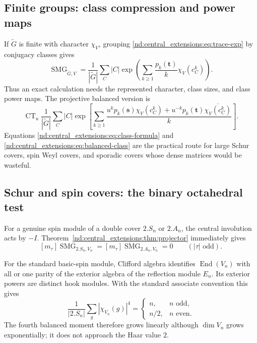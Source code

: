 \documentclass[10pt]{article}
\newcommand{\CT}{\operatorname{CT}}
\newcommand{\SMG}{\operatorname{SMG}}
\newcommand{\MGF}{\SMG}
\newcommand{\End}{\operatorname{End}}
\begin{document}
\subsection{Finite groups: class compression and power maps}

If $\widetilde G$ is finite with character $\chi_V$, grouping
\eqref{nd:central_extensions:eq:trace-exp} by conjugacy classes gives
\begin{equation}\label{nd:central_extensions:eq:class-formula}
 \boxed{\MGF_{\widetilde G,V}
 =\frac1{|\widetilde G|}\sum_{C}|C|
 \exp\!\left(\sum_{k\geq1}\frac{p_k(\mathbf t)}{k}
                         \chi_V(c_C^k)\right).}
\end{equation}
Thus an exact calculation needs the represented character, class sizes, and
class power maps.  The projective balanced version is
\begin{equation}\label{nd:central_extensions:eq:balanced-class}
 \CT_u\frac1{|\widetilde G|}\sum_C|C|\exp\!\left[
 \sum_{k\geq1}\frac{u^kp_k(\mathbf s)\chi_V(c_C^k)
 +u^{-k}p_k(\mathbf t)\overline{\chi_V(c_C^k)}}{k}\right].
\end{equation}
Equations \eqref{nd:central_extensions:eq:class-formula} and \eqref{nd:central_extensions:eq:balanced-class} are the
practical route for large Schur covers, spin Weyl covers, and sporadic
covers whose dense matrices would be wasteful.

\subsection{Schur and spin covers: the binary octahedral test}

For a genuine spin module of a double cover $2.S_n$ or $2.A_n$, the central
involution acts by $-I$.  Theorem~\ref{nd:central_extensions:thm:projector} immediately gives
\begin{equation}\label{nd:central_extensions:eq:spin-parity}
 [m_\tau]\MGF_{2.S_n,V_n}=[m_\tau]\MGF_{2.A_n,V_n}=0
 \qquad(|\tau|\text{ odd}).
\end{equation}

For the standard basic-spin module, Clifford algebra identifies
$\End(V_n)$ with all or one parity of the exterior algebra of the reflection
module $E_n$.  Its exterior powers are distinct hook modules.  With the
standard associate convention this gives
\begin{equation}\label{nd:central_extensions:eq:basic-spin-fourth}
 \frac1{|2.S_n|}\sum_g|\chi_{V_n}(g)|^4
 =\begin{cases}n,&n\text{ odd},\\n/2,&n\text{ even}.
 \end{cases}
\end{equation}
The fourth balanced moment therefore grows linearly although $\dim V_n$
grows exponentially; it does not approach the Haar value $2$.
\end{document}
